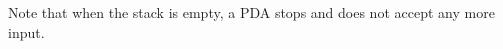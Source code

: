 

\setcounter{section}{6}
\setcounter{subsection}{1}
\setcounter{dfn}{5}


Note that when the stack is empty, a PDA stops and does not accept any more input.




